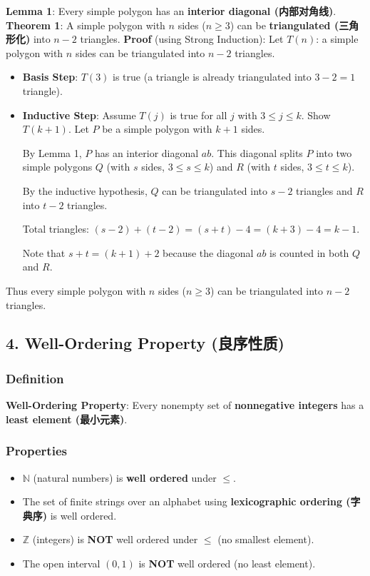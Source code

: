 \documentclass[10pt,a4paper,openany]{ctexbook}
\theoremstyle{definition}
\theoremstyle{remark}
\begin{document}
\textbf{Lemma 1}: Every simple polygon has an \textbf{interior diagonal (内部对角线)}.
\textbf{Theorem 1}: A simple polygon with $n$ sides ($n \ge 3$) can be \textbf{triangulated (三角形化)} into $n-2$ triangles.
\textbf{Proof} (using Strong Induction):
Let $T(n)$: a simple polygon with $n$ sides can be triangulated into $n-2$ triangles.
\begin{itemize}
\item \textbf{Basis Step}: $T(3)$ is true (a triangle is already triangulated into $3-2 = 1$ triangle).
\item \textbf{Inductive Step}: Assume $T(j)$ is true for all $j$ with $3 \le j \le k$. Show $T(k+1)$.
Let $P$ be a simple polygon with $k+1$ sides.

By Lemma 1, $P$ has an interior diagonal $ab$. This diagonal splits $P$ into two simple polygons $Q$ (with $s$ sides, $3 \le s \le k$) and $R$ (with $t$ sides, $3 \le t \le k$).

By the inductive hypothesis, $Q$ can be triangulated into $s-2$ triangles and $R$ into $t-2$ triangles.

Total triangles: $(s-2) + (t-2) = (s+t) - 4 = (k+3) - 4 = k-1$.

Note that $s + t = (k+1) + 2$ because the diagonal $ab$ is counted in both $Q$ and $R$.


\end{itemize}

Thus every simple polygon with $n$ sides ($n \ge 3$) can be triangulated into $n-2$ triangles.
\vspace{-2pt}

\subsection{4. Well-Ordering Property (良序性质)}

\subsubsection{Definition}

\textbf{Well-Ordering Property}: Every nonempty set of \textbf{nonnegative integers} has a \textbf{least element (最小元素)}.
\subsubsection{Properties}

\begin{itemize}
\item $\mathbb{N}$ (natural numbers) is \textbf{well ordered} under $\le$.
\item The set of finite strings over an alphabet using \textbf{lexicographic ordering (字典序)} is well ordered.
\item $\mathbb{Z}$ (integers) is \textbf{NOT} well ordered under $\le$ (no smallest element).
\item The open interval $(0, 1)$ is \textbf{NOT} well ordered (no least element).

\end{itemize}
\end{document}
